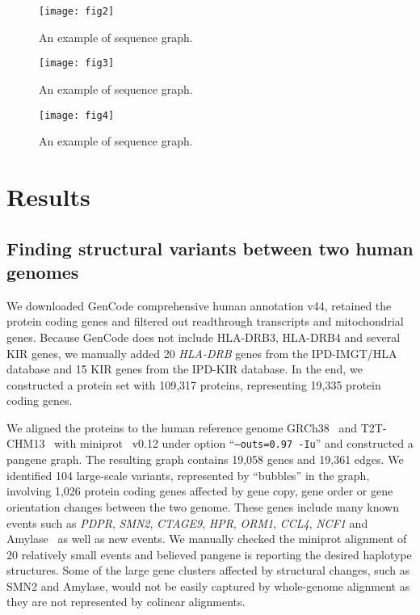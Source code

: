 \documentclass[webpdf,contemporary,large,namedate]{oup-authoring-template}%
\begin{document}
\begin{figure}
\centering
\texttt{[image: fig2]}
\caption{An example of sequence graph.}
\end{figure}

\begin{figure}
\centering
\texttt{[image: fig3]}
\caption{An example of sequence graph.}
\end{figure}

\begin{figure}
\centering
\texttt{[image: fig4]}
\caption{An example of sequence graph.}
\end{figure}

\section{Results}

\subsection{Finding structural variants between two human genomes}

We downloaded GenCode comprehensive human annotation v44,
retained the protein coding genes and filtered out readthrough transcripts and mitochondrial genes.
Because GenCode does not include HLA-DRB3, HLA-DRB4 and several KIR genes,
we manually added 20 {\it HLA-DRB} genes from the IPD-IMGT/HLA database and
15 KIR genes from the IPD-KIR database.
In the end, we constructed a protein set with 109,317 proteins, representing 19,335 protein coding genes.

We aligned the proteins to the human reference genome GRCh38~\citep{Schneider:2017aa} and T2T-CHM13~\citep{Nurk:2022up}
with miniprot~\citep{Li:2023ac} v0.12 under option ``{\tt --outs=0.97 -Iu}''
and constructed a pangene graph.
The resulting graph contains 19,058 genes and 19,361 edges.
We identified 104 large-scale variants, represented by ``bubbles'' in the graph,
involving 1,026 protein coding genes affected by gene copy, gene order or gene orientation changes between the two genome.
These genes include many known events such as {\it PDPR}, {\it SMN2}, {\it CTAGE9}, {\it HPR}, {\it ORM1}, {\it CCL4}, {\it NCF1} and Amylase~\citep{Handsaker:2015ur,Sudmant:2010aa}
as well as new events.
We manually checked the miniprot alignment of 20 relatively small events
and believed pangene is reporting the desired haplotype structures.
Some of the large gene clusters affected by structural changes, such as SMN2 and Amylase,
would not be easily captured by whole-genome alignment as they are not represented by colinear alignments.
\end{document}
